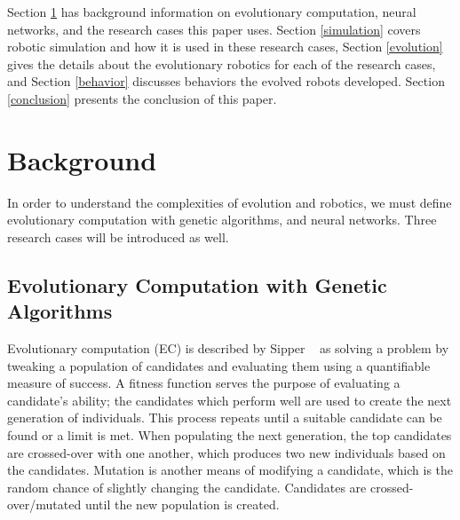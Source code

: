 \documentclass{sig-alternate}
\begin{document}
   Section \ref{background}  has  background information on evolutionary computation, neural networks, and the research cases this paper uses. Section \ref{simulation} covers robotic simulation and how it is used in these research cases, Section \ref{evolution} gives the details about the evolutionary robotics for each of the research cases, and Section \ref{behavior} discusses behaviors the evolved robots developed. Section \ref{conclusion} presents the conclusion of this paper.
 
 
\section{Background}\label{background}
In order to understand the complexities of evolution and robotics, we must define evolutionary computation with genetic algorithms, and neural networks. Three research cases will be introduced as well.

 \subsection{Evolutionary Computation with Genetic Algorithms}\label{background EC}
  Evolutionary computation (EC) is described by Sipper ~\cite{Sipper2011Win} as solving a problem by tweaking a population of candidates and evaluating them using a quantifiable measure of success. A fitness function serves the purpose of evaluating a candidate's ability; the candidates which perform well are used to create the next generation of individuals.  This process repeats until a suitable candidate can be found or a limit is met. When populating the next generation, the top candidates are crossed-over with one another, which produces two new individuals based on the candidates. Mutation is another means of modifying a candidate, which is the random chance  of slightly changing the candidate. Candidates are crossed-over/mutated until the new population is created. 
\end{document}
